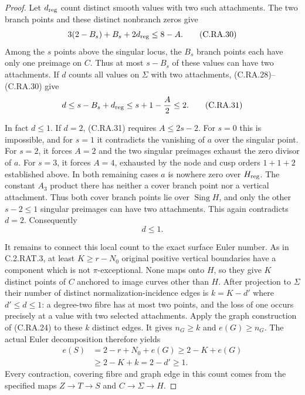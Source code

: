 \begin{proof}
Let $d_{\rm reg}$ count distinct smooth values with
two such attachments. The two branch points and these
distinct nonbranch zeros give
\[
             3(2-B_s)+B_s+2d_{\rm reg}\le8-A.
\tag{C.RA.30}
\]
Among the $s$ points above the singular locus, the
$B_s$ branch points each have only one preimage on
$C$. Thus at most $s-B_s$ of these values can have
two attachments. If $d$ counts all values on
$\Sigma$ with two attachments, (C.RA.28)--(C.RA.30)
give
\[
 d\le s-B_s+d_{\rm reg}
       \le s+1-\frac A2\le2.
\tag{C.RA.31}
\]

In fact $d\le1$. If $d=2$, (C.RA.31) requires
$A\le2s-2$. For $s=0$ this is impossible, and for
$s=1$ it contradicts the vanishing of $a$ over the
singular point. For $s=2$, it forces $A=2$ and
the two singular preimages exhaust the zero divisor
of $a$. For $s=3$, it forces $A=4$, exhausted by
the node and cusp orders $1+1+2$ established above.
In both remaining cases $a$ is nowhere zero over
$H_{\rm reg}$. The constant $A_3$ product there
has neither a cover branch point nor a vertical
attachment. Thus both cover branch points lie
over $\operatorname{Sing}H$, and only the other
$s-2\le1$ singular preimages can have two
attachments. This again contradicts $d=2$.
Consequently
\[
                            d\le1.
\tag{C.RA.31a}
\]

It remains to connect this local count to the exact
surface Euler number. As in C.2.RAT.3, at least
$K\ge r-N_0$ original positive vertical boundaries
have a component which is not $\pi$-exceptional.
None maps onto $H$, so they give $K$ distinct points
of $C$ anchored to image curves other than $H$.
After projection to $\Sigma$ their number of distinct
normalization-incidence edges is $k=K-d'$ where
$d'\le d\le1$: a degree-two fibre has at most two
points, and the loss of one occurs precisely at a
value with two selected attachments. Apply the graph
construction of (C.RA.24) to these $k$ distinct
edges. It gives $n_G\ge k$ and $e(G)\ge n_G$.
The actual Euler decomposition therefore yields
\[
\begin{split}
 e(S)&=2-r+N_0+e(G)
       \ge2-K+e(G)\\
     &\ge2-K+k=2-d'\ge1.
\end{split}
\tag{C.RA.32}
\]
Every contraction, covering fibre and graph edge in
this count comes from the specified maps
$Z\to T\to S$ and $C\to\Sigma\to H$.
\end{proof}



